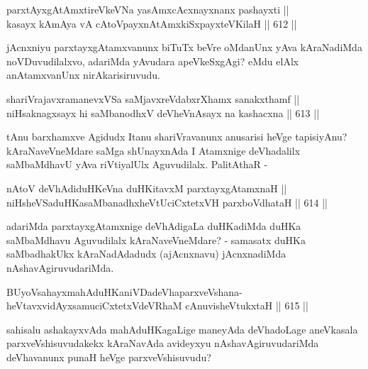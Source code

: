 
\begin{shl}
parxtAyxgAtAmxtireVkeVNa yasAmxcAcxnayxnanx pashayxti || \\
kasayx kAmAya vA cAtoV\s payxnAtAmx\s \s kiSxpayxteV\s KilaH \hfill || 612 ||  
\end{shl}

\begin{artha}
jAcnxniyu parxtayxgAtamxvanunx biTuTx beVre oMdanUnx yAva kAraNadiMda noVDuvudilalxvo, adariMda yAvudara apeVkeSxgAgi? eMdu elAlx anAtamxvanUnx nirAkarisiruvudu.
\end{artha}


\begin{shl}
shariVrajavxramanevxVSa saMjavxreVdabxrXhamx sanakxthamf || \\
niHsaknagxsayx hi saMbanodhxV deVheVnAsayx na kashacxna \hfill || 613 ||  
\end{shl}

\begin{artha}
tAnu barxhamxve Agidudx Itanu shariVravanunx anusarisi heVge tapisiyAnu? kAraNaveVneMdare saMga shUnayxnAda I Atamxnige deVhadalilx saMbaMdhavU yAva riVtiyalUlx Aguvudilalx. PalitAthaR -
\end{artha}

\begin{shl}
nAtoV deVhAdiduHKeVna duHKitavxM parxtayxgAtamxnaH || \\
niHsheVSaduHKasaMbanadhxheVtUciCxtetxVH parxboVdhataH \hfill || 614 ||  
\end{shl}

\begin{artha}
adariMda parxtayxgAtamxnige deVhAdigaLa duHKadiMda duHKa saMbaMdhavu Aguvudilalx kAraNaveVneMdare? - samasatx duHKa saMbadhakUkx kAraNadAdadudx (ajAcnxnavu) jAcnxnadiMda nAshavAgiruvudariMda.
\end{artha}


\begin{shl}
BUyoV\s sahayxmahAduHKaniVDadeVhaparxveVshana- \\
heVtavxvidAyxsamuciCxtetxVdeVRhaM cAnuvisheVtukxtaH \hfill || 615 ||  
\end{shl}

\begin{artha}
sahisalu ashakayxvAda mahAduHKagaLige maneyAda deVhadoLage aneVkasala parxveVshisuvudakekx kAraNavAda avideyxyu nAshavAgiruvudariMda deVhavanunx punaH heVge parxveVshisuvudu?
\end{artha}


